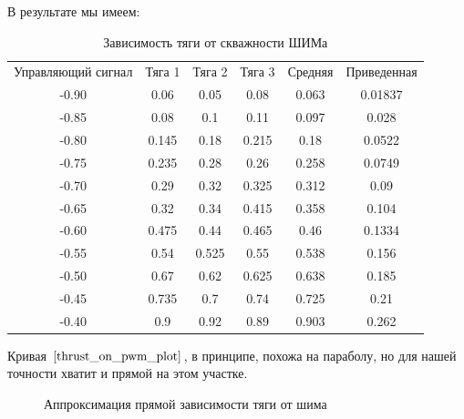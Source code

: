 \documentclass[12pt,a4paper]{article}
\begin{document}
В результате мы имеем:

\begin{table}[h]
	\caption{Зависимость тяги от скважности ШИМа}
	\label{thrust_on_pwm_data}
	\begin{center}
		\begin{tabular}{cccccc}
			Управляющий сигнал &  Тяга 1 & Тяга 2 & Тяга 3 & Средняя & Приведенная \\
			-0.90 & 0.06 & 0.05 & 0.08 & 0.063 & 0.01837 \\
			-0.85 & 0.08 & 0.1 & 0.11 & 0.097 & 0.028 \\
			-0.80 & 0.145 & 0.18 & 0.215 & 0.18 & 0.0522 \\
			-0.75 & 0.235 & 0.28 & 0.26 & 0.258 & 0.0749 \\
			-0.70 & 0.29 & 0.32 & 0.325 & 0.312 & 0.09 \\
			-0.65 & 0.32 & 0.34 & 0.415 & 0.358 & 0.104 \\
			-0.60 & 0.475 & 0.44 & 0.465 & 0.46 & 0.1334 \\
			-0.55 & 0.54 & 0.525 & 0.55 & 0.538 & 0.156 \\
			-0.50 & 0.67 & 0.62 & 0.625 & 0.638 & 0.185 \\
			-0.45 & 0.735 & 0.7 & 0.74 & 0.725 & 0.21 \\
			-0.40 & 0.9 & 0.92 & 0.89 & 0.903 & 0.262 \\
		\end{tabular}
	\end{center}
\end{table}

Кривая $\ref{thrust_on_pwm_plot}$, в принципе, похожа на параболу, но для нашей точности хватит и прямой на этом участке.

\begin{figure}[h]
	\caption{Аппроксимация прямой зависимости тяги от шима}
	\label{thrust_on_pwm_plot}
\end{figure}
\end{document}
